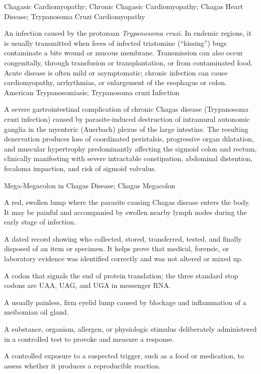 \synonyms
Chagasic Cardiomyopathy; Chronic Chagasic Cardiomyopathy; Chagas Heart Disease; Trypanosoma Cruzi Cardiomyopathy

 An infection caused by the protozoan \textit{Trypanosoma cruzi}. In endemic regions, it is usually transmitted when feces of infected triatomine (“kissing”) bugs contaminate a bite wound or mucous membrane.
Transmission can also occur congenitally, through transfusion or transplantation,
or from contaminated food. Acute disease is often mild or asymptomatic; chronic
infection can cause cardiomyopathy, arrhythmias, or enlargement of the esophagus or colon.
\synonyms
American Trypanosomiasis; Trypanosoma cruzi Infection

 A severe gastrointestinal complication of chronic Chagas disease (Trypanosoma cruzi infection) caused by parasite-induced destruction of intramural autonomic ganglia in the myenteric (Auerbach) plexus of the large intestine. The resulting denervation produces loss of coordinated peristalsis, progressive organ dilatation, and muscular hypertrophy predominantly affecting the sigmoid colon and rectum, clinically manifesting with severe intractable constipation, abdominal distention, fecaloma impaction, and risk of sigmoid volvulus.

\synonyms
Mega-Megacolon in Chagas Disease; Chagas Megacolon

 A red, swollen lump where the parasite causing Chagas disease enters the body. It may be painful and accompanied by swollen nearby lymph nodes during the early stage of infection.

 A dated record showing who collected, stored, transferred, tested, and finally disposed of an item or specimen. It helps prove that medical, forensic, or laboratory evidence was identified correctly and was not altered or mixed up.

 A codon that signals the end of protein translation; the three standard stop codons are UAA, UAG, and UGA in messenger RNA.

 A usually painless, firm eyelid lump caused by blockage and inflammation of a meibomian oil gland.

 A substance, organism, allergen, or physiologic stimulus deliberately administered in a controlled test to provoke and measure a response.

 A controlled exposure to a suspected trigger, such as a food or medication, to assess whether it produces a reproducible reaction.

